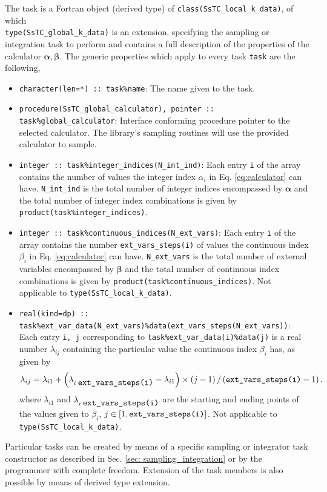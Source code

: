 \documentclass[10pt,a4paper]{article}
\begin{document}
The task is a Fortran object (derived type) of \verb|class(SsTC_local_k_data)|, of which \\ \verb|type(SsTC_global_k_data)| is an extension, specifying the sampling or integration task to perform and contains a full description of the properties of the calculator $\bm{\alpha},\bm{\beta}$. The generic properties which apply to every task \verb|task| are the following,
\begin{tcolorbox}\begin{itemize}
\item \verb|character(len=*) :: task%name|: The name given to the task.
\item \verb|procedure(SsTC_global_calculator), pointer :: task%global_calculator|: Interface conforming procedure pointer to the selected calculator. The library's sampling routines will use the provided calculator to sample.
\item \verb|integer :: task%integer_indices(N_int_ind)|: Each entry \verb|i| of the array contains the number of values the integer index $\alpha_i$ in Eq. \eqref{eq:calculator} can have. \verb|N_int_ind| is the total number of integer indices encompassed by $\bm{\alpha}$ and the total number of integer index combinations is given by \verb|product(task%integer_indices)|.
\item \verb|integer :: task%continuous_indices(N_ext_vars)|: Each entry \verb|i| of the array contains the number \verb|ext_vars_steps(i)| of values the continuous index $\beta_i$ in Eq. \eqref{eq:calculator} can have. \verb|N_ext_vars| is the total number of external variables encompassed by $\bm{\beta}$ and the total number of continuous index combinations is given by \verb|product(task%continuous_indices)|. Not applicable to \verb|type(SsTC_local_k_data)|.
\item \verb|real(kind=dp) :: task%ext_var_data(N_ext_vars)%data(ext_vars_steps(N_ext_vars))|: Each entry \verb|i, j| corresponding to \verb|task%ext_var_data(i)%data(j)| is a real number $\lambda_{ij}$ containing the particular value the continuous index $\beta_{i}$ has, as given by
\begin{equation}\label{eq:disc_cont}
\lambda_{ij} = \lambda_{i1} + \left(\lambda_{i\;\verb|ext_vars_steps(i)|} - \lambda_{i1}\right)\times\left(j - 1\right)/\left(\verb|ext_vars_steps(i)| - 1\right).
\end{equation}
where $\lambda_{i1}$ and $\lambda_{i\;\verb|ext_vars_steps(i)|}$ are the starting and ending points of the values given to $\beta_{i}$, $j\in [1, \verb|ext_vars_steps(i)|]$. Not applicable to \verb|type(SsTC_local_k_data)|.
\end{itemize}\end{tcolorbox}
Particular tasks can be created by means of a specific sampling or integrator task constructor as described in Sec. \ref{sec: sampling_integration} or by the programmer with complete freedom. Extension of the task members is also possible by means of derived type extension.
\end{document}

